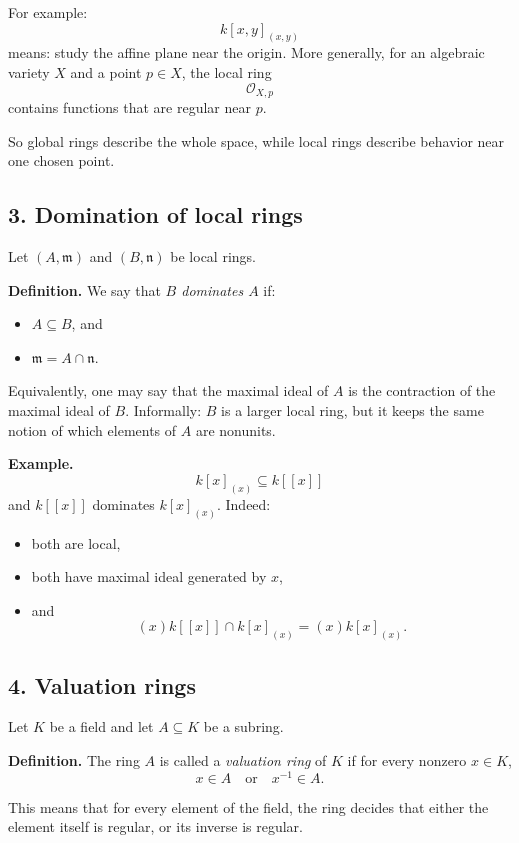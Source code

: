 \documentclass[12pt,a4paper]{article}
\theoremstyle{notespace}
\begin{document}
For example:
\[
k[x,y]_{(x,y)}
\]
means: study the affine plane near the origin. More generally, for an algebraic variety \(X\) and a point \(p\in X\), the local ring
\[
\mathcal O_{X,p}
\]
contains functions that are regular near \(p\).

So global rings describe the whole space, while local rings describe behavior near one chosen point.

\subsection{3. Domination of local rings}

Let \((A,\mathfrak m)\) and \((B,\mathfrak n)\) be local rings.

\textbf{Definition.}
We say that \emph{\(B\) dominates \(A\)} if:
\begin{itemize}
	\item \(A\subseteq B\), and
	\item \(\mathfrak m = A\cap \mathfrak n\).
\end{itemize}

Equivalently, one may say that the maximal ideal of \(A\) is the contraction of the maximal ideal of \(B\). Informally: \(B\) is a larger local ring, but it keeps the same notion of which elements of \(A\) are nonunits.

\textbf{Example.}
\[
k[x]_{(x)} \subseteq k[[x]]
\]
and \(k[[x]]\) dominates \(k[x]_{(x)}\). Indeed:
\begin{itemize}
	\item both are local,
	\item both have maximal ideal generated by \(x\),
	\item and
	\[
	(x)k[[x]]\cap k[x]_{(x)}=(x)k[x]_{(x)}.
	\]
\end{itemize}

\subsection{4. Valuation rings}

Let \(K\) be a field and let \(A\subseteq K\) be a subring.

\textbf{Definition.}
The ring \(A\) is called a \emph{valuation ring} of \(K\) if for every nonzero \(x\in K\),
\[
x\in A \quad \text{or} \quad x^{-1}\in A.
\]

This means that for every element of the field, the ring decides that either the element itself is regular, or its inverse is regular.
\end{document}
